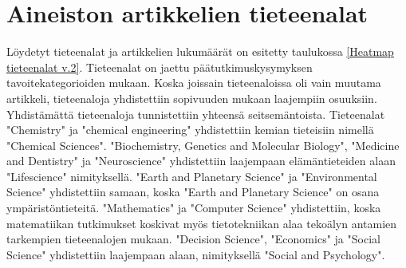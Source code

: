 \documentclass[utf8]{gradu3}
\begin{document}
\section{Aineiston artikkelien tieteenalat} \label{tieteenalat}
Löydetyt tieteenalat ja artikkelien lukumäärät on esitetty taulukossa 
\ref{Heatmap tieteenalat v.2}.
Tieteenalat on jaettu päätutkimuskysymyksen tavoitekategorioiden mukaan.
Koska joissain tieteenaloissa oli vain muutama artikkeli, 
tieteenaloja yhdistettiin sopivuuden mukaan laajempiin osuuksiin.
Yhdistämättä tieteenaloja tunnistettiin yhteensä seitsemäntoista.
Tieteenalat "Chemistry" ja "chemical engineering" yhdistettiin 
kemian tieteisiin nimellä "Chemical Sciences".
"Biochemistry, Genetics and Molecular Biology", "Medicine and Dentistry" ja "Neuroscience"
yhdistettiin laajempaan elämäntieteiden alaan "Lifescience" nimityksellä.
"Earth and Planetary Science" ja "Environmental Science" yhdistettiin samaan, 
koska "Earth and Planetary Science" on osana ympäristöntieteitä.
"Mathematics" ja "Computer Science" yhdistettiin, 
koska matematiikan tutkimukset koskivat myös tietotekniikan alaa tekoälyn 
antamien tarkempien tieteenalojen mukaan.
"Decision Science", "Economics" ja "Social Science" yhdistettiin laajempaan alaan,
nimityksellä "Social and Psychology".

\end{document}
